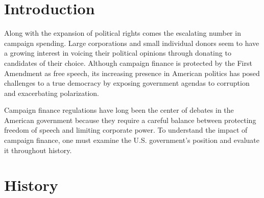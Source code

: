 \documentclass[12pt, a4paper, twoside]{article}
\begin{document}
\maketitle{}

\section{Introduction}

Along with the expansion of political rights comes the escalating number in campaign spending. Large corporations and small individual donors seem to have a growing interest in voicing their political opinions through donating to candidates of their choice. Although campaign finance is protected by the First Amendment as free speech, its increasing presence in American politics has posed challenges to a true democracy by exposing government agendas to corruption and exacerbating polarization. 

Campaign finance regulations have long been the center of debates in the American government because they require a careful balance between protecting freedom of speech and limiting corporate power. To understand the impact of campaign finance, one must examine the U.S. government’s position and evaluate it throughout history. 

\section{History}
\end{document}

